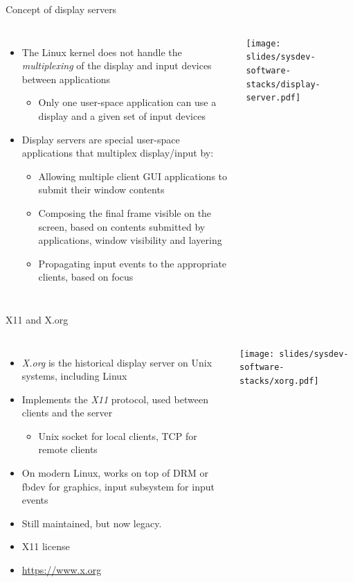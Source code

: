 \begin{frame}{Concept of display servers}
  \begin{columns}
    \begin{itemize}
    \item The Linux kernel does not handle the {\em multiplexing} of the
      display and input devices between applications
      \begin{itemize}
      \item Only one user-space application can use a display and a
        given set of input devices
      \end{itemize}
    \item Display servers are special user-space applications that
      multiplex display/input by:
      \begin{itemize}
      \item Allowing multiple client GUI applications to submit their
        window contents
      \item Composing the final frame visible on the screen, based on
        contents submitted by applications, window visibility and
        layering
      \item Propagating input events to the appropriate clients, based
        on focus
      \end{itemize}
    \end{itemize}
    \texttt{[image: slides/sysdev-software-stacks/display-server.pdf]}
  \end{columns}
\end{frame}

\begin{frame}{X11 and X.org}
  \begin{columns}[T]
    \begin{itemize}
    \item {\em X.org} is the historical display server on Unix
      systems, including Linux
    \item Implements the {\em X11} protocol, used between clients and
      the server
      \begin{itemize}
      \item Unix socket for local clients, TCP for remote clients
      \end{itemize}
    \item On modern Linux, works on top of DRM or fbdev for graphics,
      input subsystem for input events
    \item Still maintained, but now legacy.
    \item X11 license
    \item \url{https://www.x.org}
    \end{itemize}
    \texttt{[image: slides/sysdev-software-stacks/xorg.pdf]}
  \end{columns}
\end{frame}

